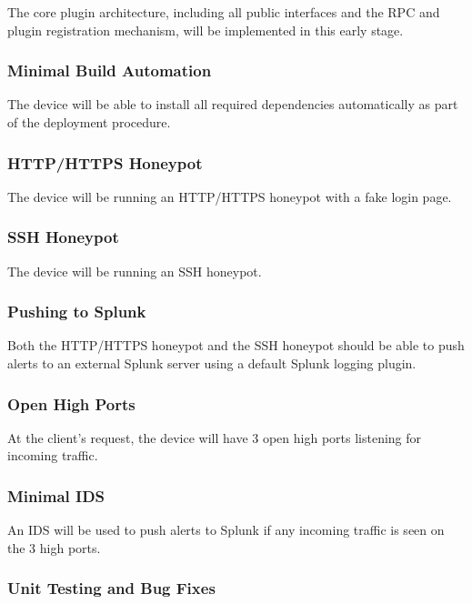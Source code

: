 The core plugin architecture, including all public interfaces and the RPC
and plugin registration mechanism, will be implemented in this early stage.

\subsubsection{Minimal Build Automation}

The device will be able to install all required dependencies automatically
as part of the deployment procedure.

\subsubsection{HTTP/HTTPS Honeypot}

The device will be running an HTTP/HTTPS honeypot with a fake login page.

\subsubsection{SSH Honeypot}

The device will be running an SSH honeypot.

\subsubsection{Pushing to Splunk}

Both the HTTP/HTTPS honeypot and the SSH honeypot should be able to push
alerts to an external Splunk server using a default Splunk logging plugin.

\subsubsection{Open High Ports}

At the client's request, the device will have 3 open high ports listening
for incoming traffic.

\subsubsection{Minimal IDS}

An IDS will be used to push alerts to Splunk if any incoming traffic is seen
on the 3 high ports.

\subsubsection{Unit Testing and Bug Fixes}

